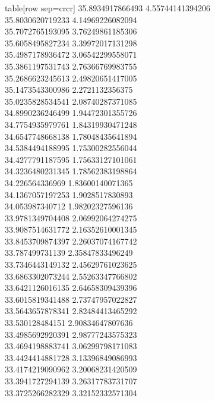   table[row sep=crcr]{%
35.8934917866493	4.55744141394206\\
35.8030620719233	4.14969226082094\\
35.7072765193095	3.76249861185306\\
35.6058495827234	3.39972017131298\\
35.4987178936472	3.06542299558071\\
35.3861197531743	2.76366769983755\\
35.2686623245613	2.49820651417005\\
35.1473543300986	2.2721132356375\\
35.0235828534541	2.08740287371085\\
34.8990236246499	1.94472301355726\\
34.7754935979761	1.84319930471248\\
34.6547748668138	1.78048435641894\\
34.5384494188995	1.75300282556044\\
34.4277791187595	1.75633127101061\\
34.3236480231345	1.78562383198864\\
34.226564336969	1.83600140071365\\
34.1367057197253	1.9028517830893\\
34.053987340712	1.98202327596136\\
33.9781349704408	2.06992064274275\\
33.9087514631772	2.16352610001345\\
33.8453709874397	2.26037074167742\\
33.787499731139	2.35847833496249\\
33.7346443149132	2.45629761023625\\
33.6863302073244	2.55263347766802\\
33.6421126016135	2.64658309439396\\
33.6015819341488	2.73747957022827\\
33.5643657878341	2.82484413465292\\
33.530128484151	2.90834647807636\\
33.4985692920391	2.98777243575323\\
33.4694198883741	3.06299798171083\\
33.4424414881728	3.13396849086993\\
33.4174219090962	3.20068231420509\\
33.3941727294139	3.26317783731707\\
33.3725266282329	3.32152332571304\\
}
